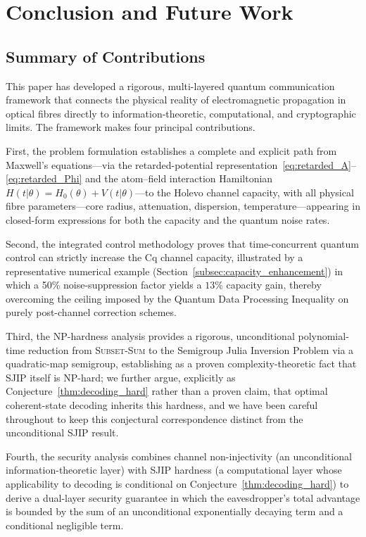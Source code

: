 \documentclass[journal,twocolumn]{IEEEtran}
\theoremstyle{definition}
\theoremstyle{plain}
\begin{document}
\section{Conclusion and Future Work}
\label{sec:conclusion}

\subsection{Summary of Contributions}

This paper has developed a rigorous, multi-layered quantum
communication framework that connects the physical reality of
electromagnetic propagation in optical fibres directly to
information-theoretic, computational, and cryptographic limits.  The
framework makes four principal contributions.

First, the problem formulation establishes a complete and explicit
path from Maxwell's equations---via the retarded-potential
representation~\eqref{eq:retarded_A}--\eqref{eq:retarded_Phi} and
the atom--field interaction Hamiltonian $H(t|\theta) = H_0(\theta)
+ V(t|\theta)$---to the Holevo channel capacity, with all physical
fibre parameters---core radius, attenuation, dispersion,
temperature---appearing in closed-form expressions for both the
capacity and the quantum noise rates.  

Second, the integrated
control methodology proves that time-concurrent quantum control can
strictly increase the Cq channel capacity, illustrated by a
representative numerical example (Section~\ref{subsec:capacity_enhancement})
in which a 50\% noise-suppression factor yields a $13\%$ capacity
gain, thereby overcoming the ceiling
imposed by the Quantum Data Processing Inequality on purely
post-channel correction schemes.  

Third, the NP-hardness analysis
provides a rigorous, unconditional polynomial-time reduction from
\textsc{Subset-Sum} to the Semigroup Julia Inversion Problem via a
quadratic-map semigroup, establishing as a proven complexity-theoretic
fact that SJIP itself is NP-hard; we further argue, explicitly as
Conjecture~\ref{thm:decoding_hard} rather than a proven claim, that
optimal coherent-state decoding inherits this hardness, and we have
been careful throughout to keep this conjectural correspondence
distinct from the unconditional SJIP result. 

Fourth, the security
analysis combines channel non-injectivity (an unconditional
information-theoretic layer) with SJIP hardness (a computational
layer whose applicability to decoding is conditional on
Conjecture~\ref{thm:decoding_hard}) to derive a dual-layer security
guarantee in which the eavesdropper's total advantage is bounded by
the sum of an unconditional exponentially decaying term and a
conditional negligible term.
\end{document}
